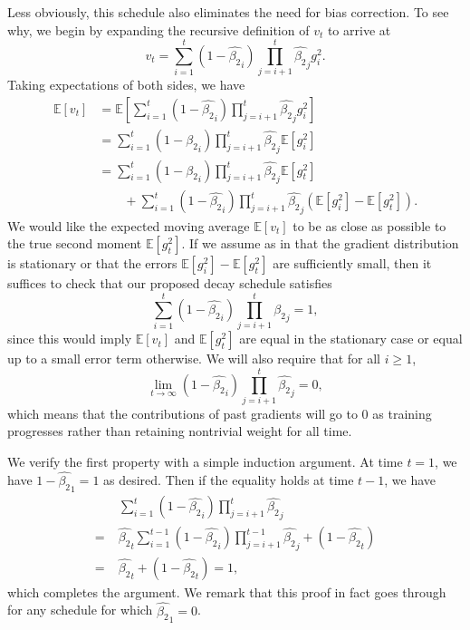 \documentclass{article}
\begin{document}
Less obviously, this schedule also eliminates the need for bias correction. To see why, we begin by expanding the recursive definition of $v_t$ to arrive at $$v_t = \sum_{i=1}^t (1 - \hat{\beta_2}_i) \prod_{j=i+1}^t \hat{\beta_2}_j g_i^2.$$ Taking expectations of both sides, we have
\begin{align*}
\mathbb{E}[v_t]
& = \mathbb{E} \left[ \sum_{i=1}^t (1 - \hat{\beta_2}_i) \prod_{j=i+1}^t \hat{\beta_2}_j g_i^2 \right] \\
& = \sum_{i=1}^t (1 - \hat{\beta_2}_i) \prod_{j=i+1}^t \hat{\beta_2}_j \mathbb{E}[g_i^2] \\
& = \sum_{i=1}^t (1 - \hat{\beta_2}_i) \prod_{j=i+1}^t \hat{\beta_2}_j \mathbb{E}[g_t^2] \\
& \qquad + \sum_{i=1}^t (1 - \hat{\beta_2}_i) \prod_{j=i+1}^t \hat{\beta_2}_j (\mathbb{E}[g_i^2] - \mathbb{E}[g_t^2]).
\end{align*}
We would like the expected moving average $\mathbb{E}[v_t]$ to be as close as possible to the true second moment $\mathbb{E}[g_t^2]$. If we assume as in \citet{Kingma14Adam} that the gradient distribution is stationary or that the errors $\mathbb{E}[g_i^2] - \mathbb{E}[g_t^2]$ are sufficiently small, then it suffices to check that our proposed decay schedule satisfies $$\sum_{i=1}^t (1 - \hat{\beta_2}_i) \prod_{j=i+1}^t \hat{\beta_2}_j = 1,$$ since this would imply $\mathbb{E}[v_t]$ and $\mathbb{E}[g_t^2]$ are equal in the stationary case or equal up to a small error term otherwise. We will also require that for all $i \ge 1$, $$\lim_{t \to \infty} (1 - \hat{\beta_2}_i) \prod_{j=i+1}^t \hat{\beta_2}_j = 0,$$ which means that the contributions of past gradients will go to 0 as training progresses rather than retaining nontrivial weight for all time.

We verify the first property with a simple induction argument. At time $t=1$, we have $1 - \hat{\beta_2}_1 = 1$ as desired. Then if the equality holds at time $t-1$, we have
\begin{align*}
& \sum_{i=1}^t (1 - \hat{\beta_2}_i) \prod_{j=i+1}^t \hat{\beta_2}_j \\
= \; & \hat{\beta_2}_t \sum_{i=1}^{t-1} (1 - \hat{\beta_2}_i) \prod_{j=i+1}^{t-1} \hat{\beta_2}_j + (1 - \hat{\beta_2}_t) \\
= \; & \hat{\beta_2}_t + (1 - \hat{\beta_2}_t) = 1,
\end{align*}
which completes the argument. We remark that this proof in fact goes through for any schedule for which $\hat{\beta_2}_1 = 0$.
\end{document}
